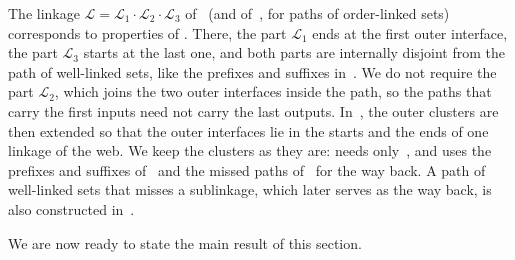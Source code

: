 \documentclass[fontsize=12pt,leading=14pt]{fullpaper}
\newcommand{\Lcal}{\mathcal{L}}
\begin{document}
The linkage $\Lcal=\Lcal_1\cdot\Lcal_2\cdot\Lcal_3$ of~\cite[Lemma~9.7]{HKMM26a} (and of~\cite[Lemma~9.2]{HKMM26a}, for paths of order-linked sets) corresponds to properties  of .
There, the part $\Lcal_1$ ends at the first outer interface, the part $\Lcal_3$ starts at the last one, and both parts are internally disjoint from the path of well-linked sets, like the prefixes and suffixes in~.
We do not require the part $\Lcal_2$, which joins the two outer interfaces inside the path, so the paths that carry the first inputs need not carry the last outputs.
In~\cite[Lemma~9.4 and Corollary~9.8]{HKMM26a}, the outer clusters are then extended so that the outer interfaces lie in the starts and the ends of one linkage of the web.
We keep the clusters as they are:  needs only~, and  uses the prefixes and suffixes of~ and the missed paths of~ for the way back.
A path of well-linked sets that misses a sublinkage, which later serves as the way back, is also constructed in~\cite[Lemma~4.9]{HKMM26b}.

We are now ready to state the main result of this section.
\end{document}
